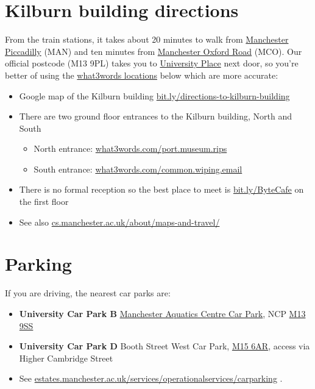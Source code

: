 \documentclass[12pt,]{book}
\providecommand{\tightlist}{%
  \setlength{\itemsep}{0pt}\setlength{\parskip}{0pt}}
\begin{document}
\hypertarget{kilburn-building-directions}{%
\section{Kilburn building directions}\label{kilburn-building-directions}}

From the train stations, it takes about 20 minutes to walk from \href{https://www.nationalrail.co.uk/stations_destinations/man.aspx}{Manchester Piccadilly} (MAN) and ten minutes from \href{https://www.nationalrail.co.uk/stations/mco/details.aspx}{Manchester Oxford Road} (MCO). Our official postcode (M13 9PL) takes you to \href{http://www.conference.manchester.ac.uk/venues/search/details/?property=10}{University Place} next door, so you're better of using the \href{https://www.bbc.co.uk/news/uk-england-49319760}{what3words locations} below which are more accurate:

\begin{itemize}
\tightlist
\item
  Google map of the Kilburn building \href{http://bit.ly/directions-to-kilburn-building}{bit.ly/directions-to-kilburn-building}
\item
  There are two ground floor entrances to the Kilburn building, North and South

  \begin{itemize}
  \tightlist
  \item
    North entrance: \href{https://what3words.com/port.museum.rips}{what3words.com/port.museum.rips}
  \item
    South entrance: \href{https://what3words.com/common.wiping.email}{what3words.com/common.wiping.email}
  \end{itemize}
\item
  There is no formal reception so the best place to meet is \href{http://bit.ly/ByteCafe}{bit.ly/ByteCafe} on the first floor
\item
  See also \href{https://www.cs.manchester.ac.uk/about/maps-and-travel/}{cs.manchester.ac.uk/about/maps-and-travel/}
\end{itemize}

\hypertarget{parking}{%
\section{Parking}\label{parking}}

If you are driving, the nearest car parks are:

\begin{itemize}
\tightlist
\item
  \textbf{University Car Park B} \href{https://www.ncp.co.uk/find-a-car-park/car-parks/manchester-aquatic-centre-jv/}{Manchester Aquatics Centre Car Park}, NCP \href{http://maps.google.co.uk/maps?q=M13+9SS}{M13 9SS}
\item
  \textbf{University Car Park D} Booth Street West Car Park, \href{http://maps.google.co.uk/maps?q=M15+6AR}{M15 6AR}, access via Higher Cambridge Street
\item
  See \href{https://www.estates.manchester.ac.uk/services/operationalservices/carparking/}{estates.manchester.ac.uk/services/operationalservices/carparking}
  .
\end{itemize}


\end{document}
